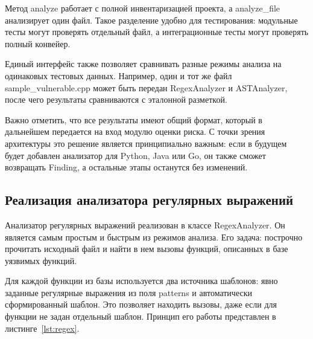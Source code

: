 \documentclass{itmo-vkr}
\begin{document}
Метод analyze работает с полной инвентаризацией проекта, а analyze\_file анализирует один файл. Такое разделение удобно для тестирования: модульные тесты могут проверять отдельный файл, а интеграционные тесты могут проверять полный конвейер.

Единый интерфейс также позволяет сравнивать разные режимы анализа на одинаковых тестовых данных. Например, один и тот же файл sample\_vulnerable.cpp может быть передан RegexAnalyzer и ASTAnalyzer, после чего результаты сравниваются с эталонной разметкой.

Важно отметить, что все результаты имеют общий формат, который в дальнейшем передается на вход модулю оценки риска. С точки зрения архитектуры это решение является принципиально важным: если в будущем будет добавлен анализатор для Python, Java или Go, он также сможет возвращать Finding, а остальные этапы останутся без изменений.

\subsection{Реализация анализатора регулярных выражений}

Анализатор регулярных выражений реализован в классе RegexAnalyzer. Он является самым простым и быстрым из режимов анализа. Его задача: построчно прочитать исходный файл и найти в нем вызовы функций, описанных в базе уязвимых функций.

Для каждой функции из базы используется два источника шаблонов: явно заданные регулярные выражения из поля patterns и автоматически сформированный шаблон. Это позволяет находить вызовы, даже если для функции не задан отдельный шаблон. Принцип его работы представлен в листинге~\ref{lst:regex}.
\end{document}

